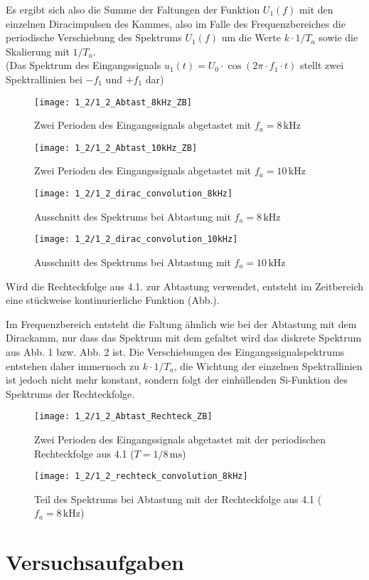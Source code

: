 \documentclass[a4paper, 12pt]{article}
\begin{document}
Es ergibt sich also die Summe der Faltungen der Funktion $U_1(f)$ mit den einzelnen
Diracimpulsen des Kammes, also im Falle des Frequenzbereiches die periodische Verschiebung
des Spektrums $U_1(f)$ um die Werte $k \cdot 1/T_a$ sowie die Skalierung mit
$1/T_a$.\\

(Das Spektrum des Eingangssignals $u_1(t) = U_0 \cdot \cos{(2 \pi \cdot
  f_1 \cdot t)}$ stellt zwei Spektrallinien bei $-f_1$ und $+f_1$ dar)

\begin{figure}[H]
	\texttt{[image: 1\_2/1\_2\_Abtast\_8kHz\_ZB]}
  \caption{Zwei Perioden des Eingangssignals abgetastet mit $f_a=8\,\si{\kilo\hertz}$}
\end{figure}

\begin{figure}[H]
	\texttt{[image: 1\_2/1\_2\_Abtast\_10kHz\_ZB]}
  \caption{Zwei Perioden des Eingangssignals abgetastet mit $f_a=10\,\si{\kilo\hertz}$}
\end{figure}

\begin{figure}[H]
	\texttt{[image: 1\_2/1\_2\_dirac\_convolution\_8kHz]}
  \caption{Ausschnitt des Spektrums bei Abtastung mit $f_a = 8 \, \si{\kilo\hertz}$}
\end{figure}

\begin{figure}[H]
	\texttt{[image: 1\_2/1\_2\_dirac\_convolution\_10kHz]}
  \caption{Ausschnitt des Spektrums bei Abtastung mit $f_a = 10 \, \si{\kilo\hertz}$}
\end{figure}

Wird die Rechteckfolge aus 4.1. zur Abtastung verwendet, entsteht im Zeitbereich
eine stückweise kontinurierliche Funktion (Abb.).

Im Frequenzbereich entsteht die Faltung ähnlich wie bei der Abtastung mit dem
Dirackamm, nur dass das Spektrum mit dem gefaltet wird das diskrete Spektrum aus
Abb. 1 bzw. Abb. 2 ist.
Die Verschiebungen des Eingangssignalspektrums entstehen daher immernoch zu $k
\cdot 1/T_a$, die Wichtung der einzelnen Spektrallinien
ist jedoch nicht mehr konstant, sondern folgt der einhüllenden Si-Funktion des
Spektrums der Rechteckfolge.

\begin{figure}[H]
	\texttt{[image: 1\_2/1\_2\_Abtast\_Rechteck\_ZB]}
  \caption{Zwei Perioden des Eingangssignals abgetastet mit der periodischen
    Rechteckfolge aus 4.1 ($T=1/8 \,\si{\milli\second}$)}
\end{figure}

\begin{figure}[H]
	\texttt{[image: 1\_2/1\_2\_rechteck\_convolution\_8kHz]}
  \caption{Teil des Spektrums bei Abtastung mit der Rechteckfolge aus 4.1 ($f_a = 8 \,\si{\kilo\hertz}$)}
\end{figure}


\section{Versuchsaufgaben}
\end{document}
